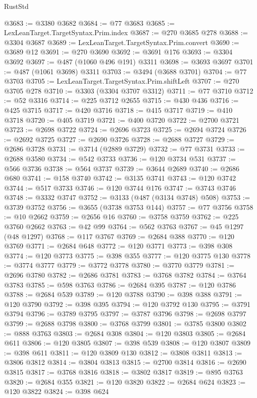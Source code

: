 \begin{lexlean}{RustStd}
\begin{coremodule}
{\begin{coremodule}
{{{{{{{{{{{{{{{{{{{{{{{{{{{{{{{{{{{{{{{{{{{{{{{{{{{{{{{{{{{{@3683 := @3380 @3682
@3684 := @77 @3683
@3685 := LexLeanTarget.TargetSyntax.Prim.index
@3687 := @270 @3685 @278
@3688 := @3304 @3687
@3689 := LexLeanTarget.TargetSyntax.Prim.convert
@3690 := @3689 @12
@3691 := @270 @3690
@3692 := @3691 @176
@3693 := @3304 @3692
@3697 := @487 (@1060 @496 @191) @3311
@3698 := @3693 @3697
@3701 := @487 (@1061 @3698) @3311
@3703 := @3494 (@3688 @3701)
@3704 := @77 @3703
@3705 := LexLeanTarget.TargetSyntax.Prim.shiftLeft
@3707 := @270 @3705 @278
@3710 := @3303 (@3304 @3707 @3312)
@3711 := @77 @3710
@3712 := @52 @3316
@3714 := @225 @3712 @2655
@3715 := @430 @436
@3716 := @425 @3715
@3717 := @420 @3716
@3718 := @415 @3717
@3719 := @410 @3718
@3720 := @405 @3719
@3721 := @400 @3720
@3722 := @2700 @3721
@3723 := @2698 @3722
@3724 := @2696 @3723
@3725 := @2694 @3724
@3726 := @2692 @3725
@3727 := @2690 @3726
@3728 := @2688 @3727
@3729 := @2686 @3728
@3731 := @3714 (@2889 @3729)
@3732 := @77 @3731
@3733 := @2688 @3580
@3734 := @542 @3733
@3736 := @120 @3734 @531
@3737 := @566 @3736
@3738 := @564 @3737
@3739 := @3644 @2689
@3740 := @2686 @680
@3741 := @158 @3740
@3742 := @3135 @3741
@3743 := @120 @3742
@3744 := @517 @3733
@3746 := @120 @3744 @176
@3747 := @3743 @3746
@3748 := @3332 @3747
@3752 := @3133 (@487 (@3134 @3748) @508)
@3753 := @3739 @3752
@3756 := @3655 (@3738 @3753 @144)
@3757 := @77 @3756
@3758 := @10 @2662
@3759 := @2656 @16
@3760 := @3758 @3759
@3762 := @225 @3760 @2662
@3763 := @42 @99
@3764 := @562 @3763
@3767 := @45 @1297 (@48 @1297)
@3768 := @117 @3767
@3769 := @2684 @388
@3770 := @120 @3769
@3771 := @2684 @648
@3772 := @120 @3771
@3773 := @398 @308
@3774 := @120 @3773
@3775 := @398 @355
@3777 := @120 @3775 @130
@3778 := @3774 @3777
@3779 := @3772 @3778
@3780 := @3770 @3779
@3781 := @2696 @3780
@3782 := @2686 @3781
@3783 := @3768 @3782
@3784 := @3764 @3783
@3785 := @598 @3763
@3786 := @2684 @395
@3787 := @120 @3786
@3788 := @2684 @539
@3789 := @120 @3788
@3790 := @398 @388
@3791 := @120 @3790
@3792 := @398 @395
@3794 := @120 @3792 @130
@3795 := @3791 @3794
@3796 := @3789 @3795
@3797 := @3787 @3796
@3798 := @2698 @3797
@3799 := @2688 @3798
@3800 := @3768 @3799
@3801 := @3785 @3800
@3802 := @888 @3763
@3803 := @2684 @308
@3804 := @120 @3803
@3805 := @2684 @611
@3806 := @120 @3805
@3807 := @398 @539
@3808 := @120 @3807
@3809 := @398 @611
@3811 := @120 @3809 @130
@3812 := @3808 @3811
@3813 := @3806 @3812
@3814 := @3804 @3813
@3815 := @2700 @3814
@3816 := @2690 @3815
@3817 := @3768 @3816
@3818 := @3802 @3817
@3819 := @895 @3763
@3820 := @2684 @355
@3821 := @120 @3820
@3822 := @2684 @624
@3823 := @120 @3822
@3824 := @398 @624
}}}}}}}}}}}}}}}}}}}}}}}}}}}}}}}}}}}}}}}}}}}}}}}}}}}}}}}}}}}}
\end{coremodule}}
\end{coremodule}
\end{lexlean}
